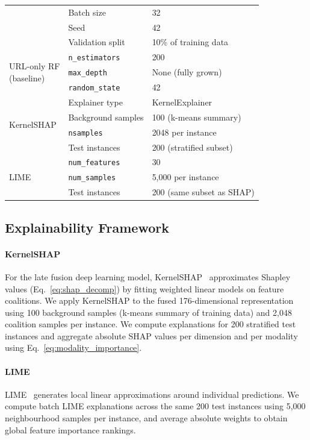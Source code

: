 \documentclass[conference]{IEEEtran}
\begin{document}
\begin{table}[t]
\begin{tabular}{llp{4.0cm}}
  & Batch size           & 32 \\
  & Seed                 & 42 \\
  & Validation split     & 10\% of training data \\
\midrule
\multirow{3}{*}{\parbox{2.5cm}{URL-only RF\\(baseline)}}
  & \texttt{n\_estimators}   & 200 \\
  & \texttt{max\_depth}      & None (fully grown) \\
  & \texttt{random\_state}   & 42 \\
\midrule
\multirow{4}{*}{KernelSHAP}
  & Explainer type           & KernelExplainer \\
  & Background samples       & 100 (k-means summary) \\
  & \texttt{nsamples}        & 2048 per instance \\
  & Test instances           & 200 (stratified subset) \\
\midrule
\multirow{3}{*}{LIME}
  & \texttt{num\_features}   & 30 \\
  & \texttt{num\_samples}    & 5,000 per instance \\
  & Test instances           & 200 (same subset as SHAP) \\
\bottomrule
\end{tabular}
\end{table}

\subsection{Explainability Framework}
\label{subsec:explainability}

\paragraph{KernelSHAP}
For the late fusion deep learning model, KernelSHAP~\cite{lundberg2017}
approximates Shapley values (Eq.~\ref{eq:shap_decomp}) by fitting weighted
linear models on feature coalitions. We apply KernelSHAP to the fused
176-dimensional representation using 100 background samples (k-means summary
of training data) and 2,048 coalition samples per instance. We compute
explanations for 200 stratified test instances and aggregate absolute SHAP
values per dimension and per modality using Eq.~\ref{eq:modality_importance}.

\paragraph{LIME}
LIME~\cite{ribeiro2016} generates local linear approximations around
individual predictions. We compute batch LIME explanations across the same
200 test instances using 5,000 neighbourhood samples per instance,
and average absolute weights to obtain global feature importance rankings.
\end{document}
